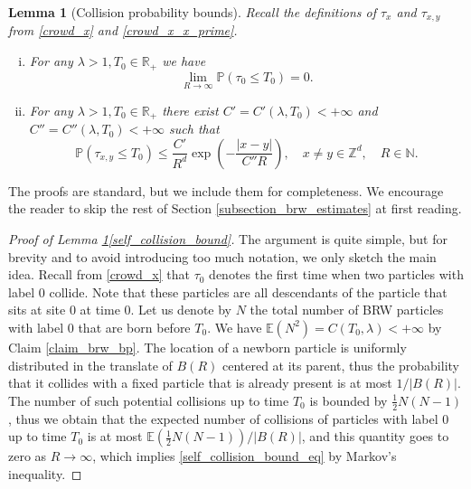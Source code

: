 \documentclass[a4paper,12pt]{article}
\newtheorem  {lemma}         [theorem]{Lemma}
\begin{document}
\begin{lemma}[Collision probability bounds] \label{lemma_crowd_bounds}
Recall the definitions of $\tau_{x}$ and $\tau_{x,y}$ from \eqref{crowd_x} and \eqref{crowd_x_x_prime}.
\begin{enumerate}[(i)]
\item \label{self_collision_bound}
For any $\lambda>1, T_0 \in \mathbb{R}_+$  we have
\begin{equation}\label{self_collision_bound_eq}
 \lim_{R \to \infty} \mathbb{P}(\tau_{0} \leq T_0 ) =0.
\end{equation}
\item \label{pair_collision_bound}
For any  $\lambda>1, T_0 \in \mathbb{R}_+$ there exist $C'=C'(\lambda,T_0)<+\infty$ and $C''=C''(\lambda,T_0)<+\infty$ such that
\begin{equation}\label{pair_collision_bound_eq}
 \mathbb{P}(\tau_{x,y} \leq T_0 ) \leq   \frac{C'}{R^{d}}  \exp\left(  -  \frac{|x-y|}{C'' R } \right), \quad x \neq y \in \mathbb{Z}^d, \quad R \in \mathbb{N}.
\end{equation}
\end{enumerate}
\end{lemma}

The proofs are standard, but we include them for completeness. We encourage the reader to skip the rest of Section \ref{subsection_brw_estimates} at first reading.

\begin{proof}[Proof of Lemma \ref{lemma_crowd_bounds}\eqref{self_collision_bound}] The argument is quite simple, but for brevity and to avoid introducing too much notation, we only sketch the main idea. Recall from \eqref{crowd_x} that $\tau_0$
denotes the first time when two particles with label $0$ collide. Note that these particles are all descendants of the particle that sits at site $0$ at time $0$.
 Let us denote by $N$ the total number of BRW particles
with label $0$ that are born before $T_0$. We have $\mathbb{E}(N^2)=C(T_0,\lambda)<+\infty$ by Claim \ref{claim_brw_bp}. The location of a newborn particle
is uniformly distributed in the translate of $B(R)$ centered at its parent,
thus the probability that it collides with a fixed particle that is already present is at most $1/|B(R)|$. The number of such potential collisions
up to time $T_0$ is bounded by $ \frac{1}{2} N (N-1)$, thus we obtain that the expected number of collisions of particles with label $0$ up to time $T_0$
is at most $\mathbb{E}( \frac{1}{2} N(N-1))/|B(R)|$, and this quantity goes to zero as $R \to \infty$, which implies \eqref{self_collision_bound_eq} by Markov's inequality.
\end{proof}
\end{document}
